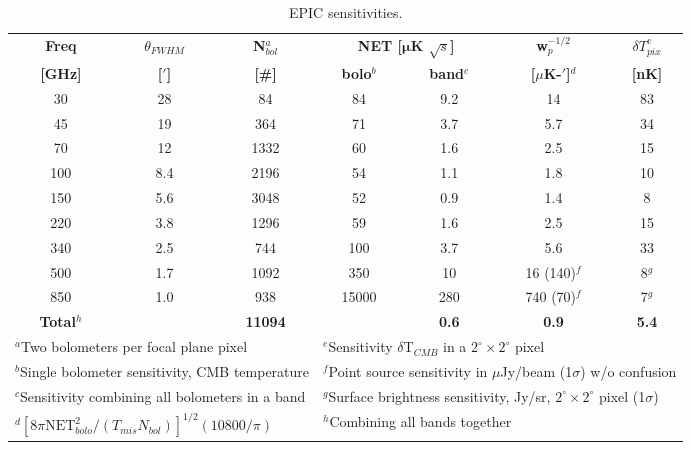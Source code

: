 \begin{table}[h]
\small
\centering
\begin{tabular}{|c|c|c|c|c|c|c|}
\hline
{\bf Freq} & { $\theta_{FWHM}$} & {\bf N$_{bol}^a$} & \multicolumn{2}{|c|}{\bf NET [$\pmb\mu$K $\sqrt{s}$]} & {\bf w$_p^{-1/2}$} & {\bf $\delta T_{pix}^e$ } \\ \cline{4-5}
{\bf [GHz]} & {\bf [$'$]} & {\bf [\#]} & {\bf bolo$^b$} & {\bf band$^c$} & {\bf [$\mu$K-$'$]$^d$} & {\bf [nK]} \\ \hline
30  & 28  & 84   & 84  & 9.2 & 14 & 83 \\ \hline
45  & 19  & 364  & 71  & 3.7 & 5.7 & 34 \\ \hline
70  & 12  & 1332 & 60  & 1.6 & 2.5 & 15 \\ \hline
100 & 8.4 & 2196 & 54  & 1.1 & 1.8 & 10 \\ \hline
150 & 5.6 & 3048 & 52  & 0.9 & 1.4 & 8  \\ \hline
220 & 3.8 & 1296 & 59  & 1.6 & 2.5 & 15 \\ \hline
340 & 2.5 & 744  & 100  & 3.7 & 5.6 & 33 \\ \hline
500 & 1.7 & 1092 & 350  & 10  & 16 (140)$^f$ & 8$^g$ \\ \hline
850 & 1.0 & 938  & 15000  & 280 & 740 (70)$^f$ & 7$^g$ \\ \hline
{\bf Total$^h$} & & {\bf 11094} & & {\bf 0.6} & {\bf 0.9} & {\bf 5.4} \\
\hline
\multicolumn{3}{|l}{\footnotesize$^a$Two bolometers per focal plane pixel} & \multicolumn{4}{l|}{\footnotesize$^e$Sensitivity $\delta$T$_{CMB}$ in a $2^{\circ} \times 2^{\circ}$ pixel} \\
\multicolumn{3}{|l}{\footnotesize$^b$Single bolometer sensitivity, CMB temperature} & \multicolumn{4}{l|}{\footnotesize$^f$Point source sensitivity in $\mu$Jy/beam (1$\sigma$) w/o confusion} \\
\multicolumn{3}{|l}{\footnotesize$^c$Sensitivity combining all bolometers in a band} & \multicolumn{4}{l|}{\footnotesize$^g$Surface brightness sensitivity, Jy/sr, $2^{\circ} \times 2^{\circ}$ pixel (1$\sigma$) } \\
\multicolumn{3}{|l}{\footnotesize$^d[8\pi \mbox{NET}_{bolo}^2 / (T_{mis}N_{bol})]^{1/2}(10800/\pi)$} & \multicolumn{4}{l|}{\footnotesize$^h$Combining all bands together} \\
\hline
\end{tabular}
\vspace{-0.13in}
\caption{ \small \setlength{\baselineskip}{0.96\baselineskip}
EPIC sensitivities. 
\label{tab:epic} }
\normalsize
\vspace{-0.05in}
\end{table}


